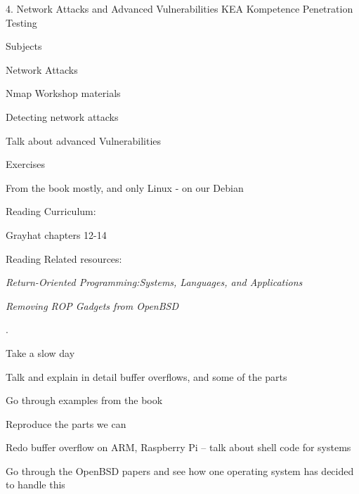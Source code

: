 \documentclass[Screen16to9,17pt]{foils}
\begin{document}
\mytitlepage
{4. Network Attacks and Advanced Vulnerabilities}
{KEA Kompetence Penetration Testing}





\begin{list1}
\item Subjects
\begin{list2}
\item Network Attacks
\item Nmap Workshop materials
\item Detecting network attacks
\item Talk about advanced Vulnerabilities

\end{list2}
\item Exercises
\begin{list2}
\item From the book mostly, and only Linux - on our Debian
\end{list2}
\item  Reading Curriculum:
\begin{list2}
\item Grayhat chapters 12-14
\end{list2}
\item  Reading Related resources:
\begin{list2}
\item \emph{Return-Oriented Programming:Systems, Languages, and Applications}
\item \emph{Removing ROP Gadgets from OpenBSD}
\end{list2}
\end{list1}



.

\begin{list1}
\item Take a slow day
\item Talk and explain in detail buffer overflows, and some of the parts
\item Go through examples from the book
\item Reproduce the parts we can
\item Redo buffer overflow on ARM, Raspberry Pi -- talk about shell code for systems
\item Go through the OpenBSD papers and see how one operating system has decided to handle this
\end{list1}
\end{document}
